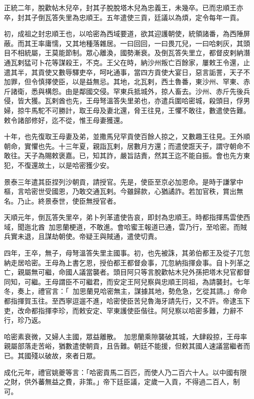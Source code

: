 \begin{pinyinscope}
正統二年，脫歡帖木兒卒，封其子脫脫塔木兒為忠義王，未幾卒。已而忠順王亦卒，封其子倒瓦答失里為忠順王。五年遣使三貢，廷議以為煩，定令每年一貢。

初，成祖之封忠順王也，以哈密為西域要道，欲其迎護朝使，統領諸番，為西陲屏蔽。而其王率庸懦，又其地種落雜居。一曰回回，一曰畏兀兒，一曰哈剌灰，其頭目不相統屬，王莫能節制。眾心離渙，國勢漸衰。及倒瓦答失里立，都督皮剌納潛通瓦剌猛可卜花等謀殺王，不克。王父在時，納沙州叛亡百餘家，屢敕王令還，止遣其半，其貢使又數辱驛吏卒，呵叱通事，當四方貢使大宴日，惡言詬詈，天子不加罪，但令慎擇使臣，以是益無忌。其地，北瓦剌，西土魯番，東沙州、罕東、赤斤諸衛，悉與構怨。由是鄰國交侵。罕東兵抵城外，掠人畜去。沙州、赤斤先後兵侵，皆大獲。瓦剌酋也先，王母弩溫答失里弟也，亦遣兵圍哈密城，殺頭目，俘男婦，掠牛馬駝不可勝計，取王母及妻北還，脅王往見，王懼不敢往，數遣使告難。敕令諸部修好，迄不從，惟王母妻獲還。

十年，也先復取王母妻及弟，並撒馬兒罕貢使百餘人掠之，又數趣王往見。王外順朝命，實懼也先。十三年夏，親詣瓦剌，居數月方還；而遣使誑天子，謂守朝命不敢往。天子為賜敕褒嘉。已，知其詐，嚴旨詰責，然其王迄不能自振。會也先方東犯，不復還故土，以是哈密獲少安。

景泰三年遣其臣捏列沙朝貢，請授官。先是，使臣至京必加恩命。是時于謙掌中樞，言哈密世受國恩，乃敢交通瓦剌。今雖歸款，心猶譎詐。若加官秩，賞出無名。乃止。終景泰世，使臣無授官者。

天順元年，倒瓦答失里卒，弟卜列革遣使告哀，即封為忠順王。時都指揮馬雲使西域，聞迤北酋加思蘭梗道，不敢進。會哈蜜王報道已通，雲乃行，至哈密。而賊兵實未退，且謀劫朝使。帝疑王與賊通，遣使切責。

四年，王卒，無子，母弩溫答失里主國事。初，也先被誅，其弟伯都王及從子兀忽納走居哈密。王母為上書乞恩，授伯都王都督僉事，兀忽納指揮僉事。自卜列革之亡，親屬無可繼，命國人議當襲者。頭目阿只等言脫歡帖木兒外孫把塔木兒官都督同知，可繼。王母謂臣不可繼君，而安定王阿兒察與忠順王同祖，為請襲封。七年冬，奏上，禮官言：「加思蘭見哈密無主，謀據其地，勢危急，乞從其請。」帝命都指揮賀玉往。至西寧逗遛不進，哈密使臣苦兒魯海牙請先行，又不許。帝逮玉下吏，改命都指揮李珍，而敕安定、罕東護使臣偕往。阿兒察以哈密多難，力辭不行，珍乃返。

哈密素衰微，又婦人主國，眾益離散。加思蘭乘隙襲破其城，大肆殺掠，王母率親屬部落走苦峪，猶數遣使朝貢，且告難。朝廷不能援，但敕其國人速議當繼者而已。其國殘以破故，來者日眾。

成化元年，禮官姚夔等言：「哈密貢馬二百匹，而使人乃二百六十人。以中國有限之財，供外蕃無益之費，非策。」帝下廷臣議，定歲一入貢，不得過二百人，制可。


\end{pinyinscope}
